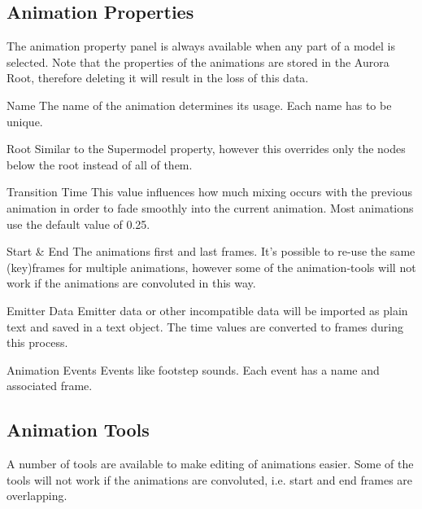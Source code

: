 \subsection{Animation Properties}
The animation property panel is always available when any part of a model is selected. Note 
that the properties of the animations are stored in the Aurora Root, therefore deleting it 
will result in the loss of this data.

\begin{propertyAurora}{Name}
    The name of the animation determines its usage. Each name has to be unique.
\end{propertyAurora}

\begin{propertyAurora}{Root}
    Similar to the Supermodel property, however this overrides only the 
    nodes below the root instead of all of them.
\end{propertyAurora}

\begin{propertyAurora}{Transition Time}
    This value influences how much mixing occurs with the previous animation in order to 
    fade smoothly into the current animation. Most animations use the default value of 0.25.
\end{propertyAurora}

\begin{propertyAurora}{Start \& End}
    The animations first and last frames. It's possible to re-use the same (key)frames for 
    multiple animations, however some of the animation-tools will not work if the animations are 
    convoluted in this way.
\end{propertyAurora}

\begin{propertyAurora}{Emitter Data}
    Emitter data or other incompatible data will be imported as plain text and saved in a text object. The
    time values are converted to frames during this process.
\end{propertyAurora}

\begin{propertyAurora}{Animation Events}
    Events like footstep sounds. Each event has a name and associated frame.
\end{propertyAurora}

\subsection{Animation Tools}
A number of tools are available to make editing of animations easier. Some 
of the tools will not work if the animations are convoluted, i.e. start and 
end frames are overlapping.

